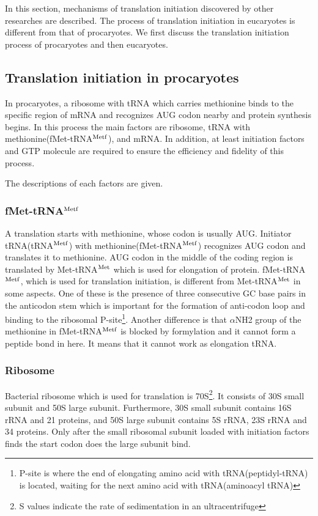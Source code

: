 In this section, mechanisms of translation initiation discovered by 
other researches are described.
The process of translation initiation in eucaryotes is different from that
of procaryotes.
We first discuss the translation initiation process of procaryotes and
then eucaryotes.


\subsection{Translation initiation in procaryotes}

In procaryotes, a ribosome with tRNA which carries methionine binds to 
the specific region of mRNA and recognizes AUG codon nearby
and protein synthesis begins. In this process the main factors are
ribosome, tRNA with methionine(fMet-tRNA$^{\rm Metf}$), and mRNA. In addition, 
at least initiation factors and GTP molecule are required to ensure
the efficiency and fidelity of this process.

The descriptions of each factors are given\cite{label20}.


\subsubsection{fMet-tRNA$^{\rm Metf}$}
A translation starts with methionine, whose codon is usually AUG.
Initiator tRNA(tRNA$^{\rm Metf}$) with methionine(fMet-tRNA$^{\rm Metf}$)
recognizes AUG codon and translates it to 
methionine.
AUG codon in the middle of the coding region is translated by 
Met-tRNA$^{\rm Met}$ which
is used for elongation of protein. fMet-tRNA$^{\rm Metf}$, which is used for 
translation
initiation, is different from Met-tRNA$^{\rm Met}$ in some aspects.
One of these is the presence of three consecutive GC base pairs in the 
anticodon stem which is important for the formation of anti-codon loop
and binding to the ribosomal P-site\footnote{P-site is where the end of
elongating amino acid with tRNA(peptidyl-tRNA) is located, 
waiting for the next amino acid with tRNA(aminoacyl tRNA)}.
Another difference is that \(\alpha\)NH2 group of the methionine in
 fMet-tRNA$^{\rm Metf}$ is blocked by formylation and it cannot form a peptide
bond in here. It means that it cannot work as elongation tRNA.

\subsubsection{Ribosome}
Bacterial ribosome which is used for translation is 70S\footnote{S values 
indicate the rate of sedimentation in an ultracentrifuge}.
It consists of 30S small subunit and 50S large subunit.
Furthermore, 30S small subunit contains 16S rRNA and 21 proteins, and
50S large subunit contains 5S rRNA, 23S rRNA and 34 proteins.
Only after the small ribosomal subunit loaded with initiation factors finds
the start codon does the large subunit bind.


